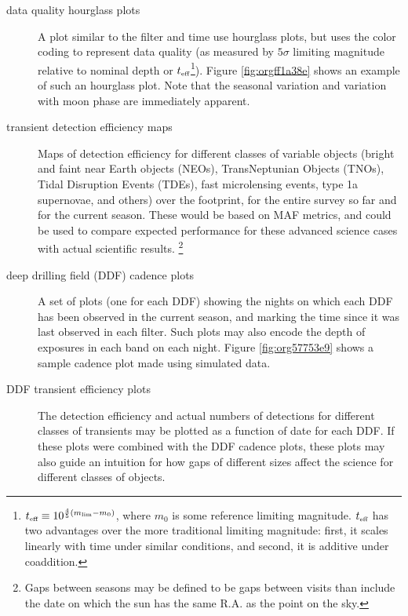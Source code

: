\begin{description}
\item[{data quality hourglass plots}] A plot similar to the filter and time use hourglass plots, but uses the color coding to represent data quality (as measured by \(5\sigma\) limiting magnitude relative to nominal depth or \(t_{\mbox{\tiny eff}}\)\footnote{\(t_{\mbox{\tiny eff}} \equiv 10^{\frac{4}{5}(m_{\mbox{\tiny lim}} - m_{0})}\), where \(m_{0}\) is some reference limiting magnitude. \(t_{\mbox{\tiny eff}}\) has two advantages over the more traditional limiting magnitude: first, it scales linearly with time under similar conditions, and second, it is additive under coaddition.}). Figure \ref{fig:orgff1a38e} shows an example of such an hourglass plot. Note that the seasonal variation and variation with moon phase are immediately apparent.
\item[{transient detection efficiency maps}] Maps of detection efficiency for different classes of variable objects (bright and faint near Earth objects (NEOs), TransNeptunian Objects (TNOs), Tidal Disruption Events (TDEs), fast microlensing events, type 1a supernovae, and others) over the footprint, for the entire survey so far and for the current season. These would be based on MAF metrics, and could be used to compare expected performance for these advanced science cases with actual scientific results. 
\footnote{Gaps between seasons may be defined to be gaps between visits than include the date on which the sun has the same R.A. as the point on the sky.}
\item[{deep drilling field (DDF) cadence plots}] A set of plots (one for each DDF) showing the nights on which each DDF has been observed in the current season, and marking the time since it was last observed in each filter. Such plots may also encode the depth of exposures in each band on each night. Figure \ref{fig:org57753e9} shows a sample cadence plot made using simulated data.
\item[{DDF transient efficiency plots}] The detection efficiency and actual numbers of detections for different classes of transients may be plotted as a function of date for each DDF. If these plots were combined with the DDF cadence plots, these plots may also guide an intuition for how gaps of different sizes affect the science for different classes of objects.
\end{description}

